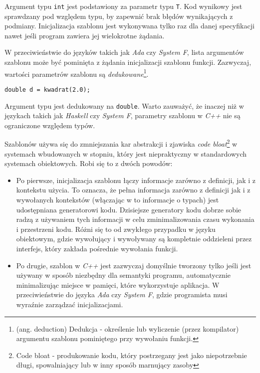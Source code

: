 \documentclass[11pt, a4paper]{article}
\begin{document}
Argument typu \verb#int# jest podstawiony za parametr typu \verb#T#. Kod wynikowy jest sprawdzany pod względem typu, by zapewnić brak błędów wynikających z podmiany. Inicjalizacja szablonu jest wykonywana tylko raz dla danej specyfikacji nawet jeśli program zawiera jej wielokrotne żądania. 

W przeciwieństwie do języków takich jak \emph{Ada} czy \emph{System F}, lista argumentów szablonu może być pominięta z żądania inicjalizacji szablonu funkcji. Zazwyczaj, wartości parametrów szablonu są \emph{dedukowane}\footnote{(ang. deduction) Dedukcja - określenie lub wyliczenie (przez kompilator) argumentu szablonu pominiętego przy wywołaniu funkcji.}.
\newline

\verb#double d = kwadrat(2.0);# \newline

Argument typu jest dedukowany na \verb#double#. Warto zauważyć, że inaczej niż w językach takich jak \emph{Haskell} czy \emph{System F}, parametry szablonu w \emph{C++} nie są ograniczone względem typów.

Szablonów używa się do zmniejszania kar abstrakcji i zjawiska \emph{code bloat}\footnote{Code bloat - produkowanie kodu, który postrzegany jest jako niepotrzebnie długi, spowalniający lub w inny sposób marnujący zasoby} w systemach wbudowanych w stopniu, który jest niepraktyczny w standardowych systemach obiektowych. Robi się to z dwóch powodów:

\begin{itemize}

\item Po pierwsze, inicjalizacja szablonu łączy informacje zarówno z definicji, jak i z kontekstu użycia. To oznacza, że pełna informacja zarówno z definicji jak i z wywołanych kontekstów (włączając w to informacje o typach) jest udostępniana generatorowi kodu. Dzisiejsze generatory kodu dobrze sobie radzą z używaniem tych informacji w celu zminimalizowania czasu wykonania i przestrzeni kodu. Różni się to od zwykłego przypadku w języku obiektowym, gdzie wywołujący i wywoływany są kompletnie oddzieleni przez interfejs, który zakłada pośrednie wywołania funkcji.

\item Po drugie, szablon w \emph{C++} jest zazwyczaj domyślnie tworzony tylko jeśli jest używany w sposób niezbędny dla semantyki programu, automatycznie minimalizując miejsce w pamięci, które wykorzystuje aplikacja. W przeciwieństwie do języka \emph{Ada} czy \emph{System F}, gdzie programista musi wyraźnie zarządzać inicjalizacjami.

\end{itemize}
\end{document}

